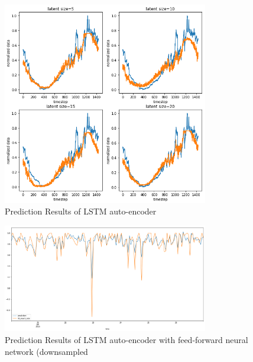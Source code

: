 \documentclass[5p]{elsarticle}
\begin{document}
\begin{figure}[h]
    \centering
    \includegraphics[width=0.8\textwidth]{lstm_auto_encoder_result.png}
    \caption{Prediction Results of LSTM auto-encoder}
    \label{fig:prediction_Results_of_LSTM_auto_encoder}
\end{figure}

\begin{figure}[h]
    \centering
    \includegraphics[width=0.8\textwidth]{result.png}
    \caption{Prediction Results of LSTM auto-encoder with feed-forward neural network (downsampled}
    \label{fig:prediction_results}
\end{figure}
\end{document}
